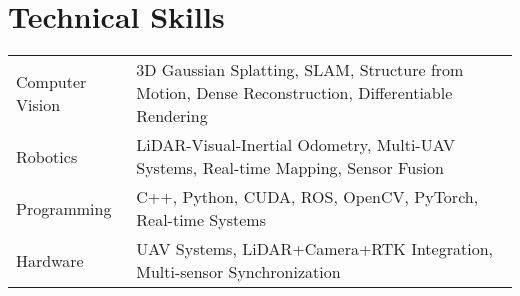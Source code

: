 \documentclass[a4paper,12pt]{article}
\begin{document}
\section{Technical Skills}
\begin{tabularx}{\linewidth}{@{}l X@{}}
Computer Vision &  \normalsize{3D Gaussian Splatting, SLAM, Structure from Motion, Dense Reconstruction, Differentiable Rendering}\\
Robotics  &  \normalsize{LiDAR-Visual-Inertial Odometry, Multi-UAV Systems, Real-time Mapping, Sensor Fusion}\\  
Programming &  \normalsize{C++, Python, CUDA, ROS, OpenCV, PyTorch, Real-time Systems}\\
Hardware &  \normalsize{UAV Systems, LiDAR+Camera+RTK Integration, Multi-sensor Synchronization}\\
\end{tabularx}

\vfill
{}
\end{document}

